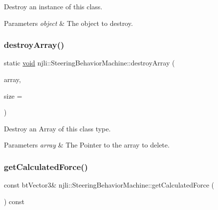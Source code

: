 Destroy an instance of this class.


\begin{DoxyParams}{Parameters}
{\em object} & The object to destroy. \\
\hline
\end{DoxyParams}
\mbox{\label{classnjli_1_1_steering_behavior_machine_a9cf768db1c04513184ada83d420af23e}} 
\subsubsection{\texorpdfstring{destroy\+Array()}{destroyArray()}}
{\footnotesize\ttfamily static \mbox{\hyperlink{_thread_8h_af1e856da2e658414cb2456cb6f7ebc66}{void}} njli\+::\+Steering\+Behavior\+Machine\+::destroy\+Array (\begin{DoxyParamCaption}\item[{\mbox{\hyperlink{classnjli_1_1_steering_behavior_machine}{Steering\+Behavior\+Machine}} $\ast$$\ast$}]{array,  }\item[{const \mbox{\hyperlink{_util_8h_a10e94b422ef0c20dcdec20d31a1f5049}{u32}}}]{size = {} }\end{DoxyParamCaption})\hspace{0.3cm}{\ttfamily [static]}}

Destroy an Array of this class type.


\begin{DoxyParams}{Parameters}
{\em array} & The Pointer to the array to delete. \\
\hline
\end{DoxyParams}
\mbox{\label{classnjli_1_1_steering_behavior_machine_a7d757fe3a0e36bcd3606f660025e1529}} 
\subsubsection{\texorpdfstring{get\+Calculated\+Force()}{getCalculatedForce()}}
{\footnotesize\ttfamily const bt\+Vector3\& njli\+::\+Steering\+Behavior\+Machine\+::get\+Calculated\+Force (\begin{DoxyParamCaption}{ }\end{DoxyParamCaption}) const}


